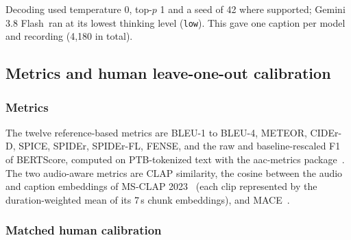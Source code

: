\documentclass{article}
\newcommand{\gem}{Gemini 3.8 Flash}
\begin{document}
\smallskip
\noindent{}
\smallskip

Decoding used temperature 0, top-$p$ 1 and a seed of 42 where supported; \gem\ ran at its lowest thinking level
(\texttt{low}). This gave one caption per model and recording (4,180 in total).

\subsection{Metrics and human leave-one-out calibration}
\label{ssec:metrics}

\subsubsection{Metrics}
\label{sssec:metrics}

The twelve reference-based metrics are BLEU-1 to BLEU-4, METEOR, CIDEr-D, SPICE, SPIDEr, SPIDEr-FL,
FENSE, and the raw and baseline-rescaled F1 of BERTScore, computed on PTB-tokenized text with the aac-metrics
package~\cite{labbe2025aacmetrics}. The two audio-aware metrics are CLAP similarity, the cosine between the audio and
caption embeddings of MS-CLAP 2023~\cite{elizalde2024msclap} (each clip represented by the duration-weighted mean of
its 7\,s chunk embeddings), and MACE~\cite{dixit2025mace}.

\subsubsection{Matched human calibration}
\label{sssec:calibration}
\end{document}
